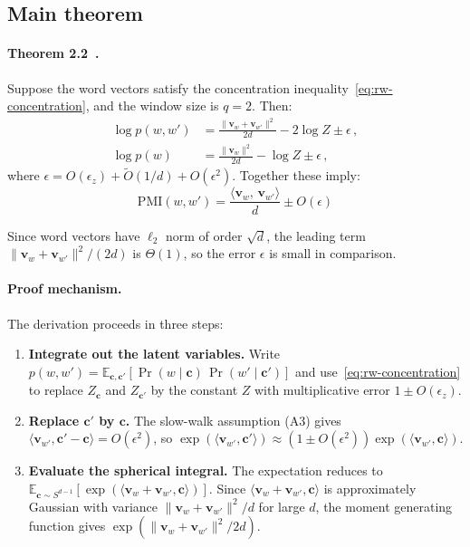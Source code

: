 \documentclass[11pt]{article}
\newcommand{\vw}{\bm{v}}
\newcommand{\PMI}{\mathrm{PMI}}
\begin{document}
\subsection{Main theorem}

\paragraph{Theorem 2.2~\cite{arora2016}.} Suppose the word vectors satisfy the concentration inequality~\eqref{eq:rw-concentration}, and the window size is $q = 2$. Then:
\begin{align}
    \log p(w, w') &= \frac{\|\vw_w + \vw_{w'}\|^2}{2d} - 2\log Z \pm \epsilon\,, \label{eq:rw-joint} \\
    \log p(w) &= \frac{\|\vw_w\|^2}{2d} - \log Z \pm \epsilon\,, \label{eq:rw-marginal}
\end{align}
where $\epsilon = O(\epsilon_z) + \tilde{O}(1/d) + O(\epsilon^2)$. Together these imply:
\begin{equation}\label{eq:rw-pmi}
    \boxed{\;\PMI(w, w') = \frac{\langle \vw_w,\, \vw_{w'} \rangle}{d} \pm O(\epsilon)\;}
\end{equation}

Since word vectors have $\ell_2$ norm of order $\sqrt{d}$, the leading term $\|\vw_w + \vw_{w'}\|^2 / (2d)$ is $\Theta(1)$, so the error $\epsilon$ is small in comparison.

\paragraph{Proof mechanism.} The derivation proceeds in three steps:
\begin{enumerate}
    \item \textbf{Integrate out the latent variables.} Write $p(w, w') = \mathbb{E}_{\bm{c}, \bm{c}'}[\Pr(w \mid \bm{c})\,\Pr(w' \mid \bm{c}')]$ and use~\eqref{eq:rw-concentration} to replace $Z_{\bm{c}}$ and $Z_{\bm{c}'}$ by the constant $Z$ with multiplicative error $1 \pm O(\epsilon_z)$.
    \item \textbf{Replace $\bm{c}'$ by $\bm{c}$.} The slow-walk assumption (A3) gives $\langle \vw_{w'}, \bm{c}' - \bm{c} \rangle = O(\epsilon^2)$, so $\exp(\langle \vw_{w'}, \bm{c}' \rangle) \approx (1 \pm O(\epsilon^2))\exp(\langle \vw_{w'}, \bm{c} \rangle)$.
    \item \textbf{Evaluate the spherical integral.} The expectation reduces to $\mathbb{E}_{\bm{c} \sim S^{d-1}}[\exp(\langle \vw_w + \vw_{w'}, \bm{c} \rangle)]$. Since $\langle \vw_w + \vw_{w'}, \bm{c} \rangle$ is approximately Gaussian with variance $\|\vw_w + \vw_{w'}\|^2 / d$ for large $d$, the moment generating function gives $\exp(\|\vw_w + \vw_{w'}\|^2 / 2d)$.
\end{enumerate}
\end{document}
